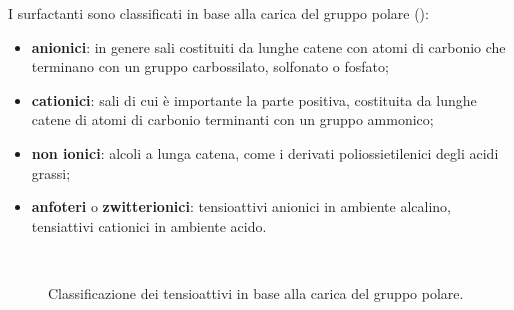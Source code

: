 I surfactanti sono classificati in base alla carica del gruppo polare ():
\begin{itemize}
    \item \textbf{anionici}: in genere sali costituiti da lunghe catene con atomi di carbonio che terminano con un gruppo carbossilato, solfonato o fosfato;
    \item \textbf{cationici}: sali di cui è importante la parte positiva, costituita da lunghe catene di atomi di carbonio terminanti con un gruppo ammonico;
    \item \textbf{non ionici}: alcoli a lunga catena, come i derivati poliossietilenici degli acidi grassi;
    \item \textbf{anfoteri} o \textbf{zwitterionici}: tensioattivi anionici in ambiente alcalino, tensiattivi cationici in ambiente acido.
\end{itemize}

\begin{figure}[htbp]
    \centering
     \quad
      \\
      \quad
\caption{Classificazione dei tensioattivi in base alla carica del gruppo polare.}
\label{fig:surfactants-classification}
\end{figure}

